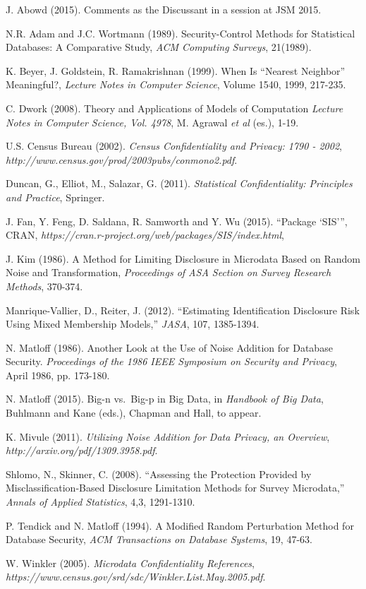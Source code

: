 \documentclass[11pt]{article}
\begin{document}
\begin{thebibliography}{}

 J. Abowd (2015). Comments as the Discussant in a session
at JSM 2015.

N.R. Adam and J.C. Wortmann (1989).
Security-Control Methods for Statistical Databases: A Comparative Study,
{\it ACM Computing Surveys}, 21(1989).

 K. Beyer, J. Goldstein, R. Ramakrishnan (1999).  When Is
``Nearest Neighbor'' Meaningful?, {\it Lecture Notes in Computer
Science}, Volume 1540, 1999, 217-235.

 C. Dwork (2008).  Theory and Applications of Models of
Computation {\it Lecture Notes in Computer Science, Vol. 4978}, M.
Agrawal {\it et al} (es.), 1-19.

 U.S. Census Bureau (2002). 
{\it Census Confidentiality and Privacy: 1790 - 2002},
{\it http://www.census.gov/prod/2003pubs/conmono2.pdf}.

 Duncan, G., Elliot, M., Salazar, G. (2011).  {\it
Statistical Confidentiality: Principles and Practice}, Springer. 

 J. Fan, Y. Feng, D. Saldana, R. Samworth and Y. Wu (2015).
``Package `SIS''', CRAN, {\it
https://cran.r-project.org/web/packages/SIS/index.html},

 J. Kim (1986).  A Method for Limiting Disclosure in
Microdata Based on Random Noise and Transformation, {\it Proceedings of
ASA Section on Survey Research Methods}, 370-374.

 Manrique-Vallier, D., Reiter, J. (2012).
``Estimating Identification Disclosure Risk Using Mixed Membership
Models,'' {\it JASA}, 107, 1385-1394.

 N. Matloff (1986). Another Look at the Use of
Noise Addition for Database Security. {\it Proceedings of the 1986 IEEE
Symposium on Security and Privacy}, April 1986, pp. 173-180.

  N. Matloff (2015).  Big-n vs.\ Big-p in Big Data,
in {\it Handbook of Big Data}, Buhlmann and Kane (eds.), Chapman and
Hall, to appear.

K. Mivule (2011).  {\it Utilizing Noise Addition for Data Privacy, an 
Overview}, {\it http://arxiv.org/pdf/1309.3958.pdf}.

Shlomo, N., Skinner, C. (2008).
``Assessing the Protection Provided by Misclassification-Based Disclosure
Limitation Methods for Survey Microdata,'' {\it Annals of Applied
Statistics}, 4,3, 1291-1310.

 P. Tendick and N. Matloff (1994).  A Modified Random
Perturbation Method for Database Security, {\it ACM Transactions on
Database Systems}, 19, 47-63.

 W. Winkler (2005). {\it Microdata Confidentiality
References}, {\it
https://www.census.gov/srd/sdc/Winkler.List.May.2005.pdf}.

\end{thebibliography}{}
\end{document}
